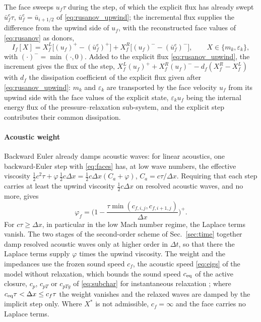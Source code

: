\documentclass[a4paper,fleqn]{cas-sc}
\begin{document}
The face sweeps $u_f\tau$ during the step, of which the explicit flux has already swept $\bar u^e_f\tau$, $\bar u^e_f=\bar u_{i+1/2}$ of \eqref{eq:rusanov_upwind}; the
incremental flux supplies the difference from the upwind side of $u_f$, with the reconstructed face values of
\eqref{eq:rusanov} as donors,
\begin{equation}
I_f[X]=X^L_f\big[(u_f)^+-(\bar u^e_f)^+\big]+X^R_f\big[(u_f)^--(\bar u^e_f)^-\big],\qquad X\in\{m_k,\varepsilon_k\},
\label{eq:increment}
\end{equation}
with $(\cdot)^-=\min(\cdot,0)$. Added to the explicit flux \eqref{eq:rusanov_upwind}, the increment gives the flux of the step,
$X^L_f(u_f)^++X^R_f(u_f)^--d_f(X^R_f-X^L_f)$ with $d_f$ the dissipation coefficient of the explicit flux given after \eqref{eq:rusanov_upwind}: $m_k$ and $\varepsilon_k$ are transported by the
face velocity $u_f$ from its upwind side with the face values of the explicit state, $\varepsilon_ku_f$ being the internal energy flux of the
pressure--relaxation sub-system, and the explicit step contributes their common dissipation.

\paragraph{Acoustic weight}
Backward Euler already damps acoustic waves: for linear acoustics, one backward-Euler step with \eqref{eq:faces} has, at low wave
numbers, the effective viscosity $\tfrac12c^2\tau+\varphi\,\tfrac12c\Delta x=\tfrac12c\Delta x(C_a+\varphi)$, $C_a=c\tau/\Delta x$. Requiring that each step carries at least
the upwind viscosity $\tfrac12c\Delta x$ on resolved acoustic waves, and no more, gives
\begin{equation}
\varphi_f=\Big(1-\frac{\tau\min(c_{f,i,j},c_{f,i+1,j})}{\Delta x}\Big)^+ .
\label{eq:weight}
\end{equation}
For $c\tau\ge\Delta x$, in particular in the low Mach number
regime, the Laplace terms vanish. The two stages of the second-order scheme of Sec.~\ref{sec:time} together damp resolved acoustic waves only at higher order in $\Delta t$, so
that there the Laplace terms supply $\varphi$ times the upwind viscosity. The weight and the impedances use the frozen sound speed
$c_f$, the acoustic speed \eqref{eq:eigs} of the model without relaxation, which bounds the sound speed $c_{\rm eq}$ of the active
closure, $c_p$, $c_{pT}$ or $c_{pTg}$ of \eqref{eq:subchar} for instantaneous relaxation \cite{FlattenLund2011}; where $c_{\rm eq}\tau<\Delta x\le c_f\tau$ the
weight vanishes and the relaxed waves are damped by the implicit step only. Where $X^*$ is not admissible, $c_f=\infty$ and the face carries no Laplace terms.
\end{document}
